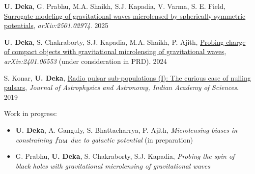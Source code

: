 \begin{itemize}[noitemsep]
{
\item\textbf{U. Deka}, G. Prabhu, M.A. Shaikh, S.J. Kapadia, V. Varma, S. E. Field, \href{https://arxiv.org/abs/2501.02974}{Surrogate modeling of gravitational waves microlensed by spherically symmetric potentials}, \textit{arXiv:2501.02974}. \hfill 2025
\item \textbf{U. Deka}, S. Chakraborty, S.J. Kapadia, M.A. Shaikh, P. Ajith, \href{https://arxiv.org/pdf/2401.06553}{Probing charge of compact objects with gravitational microlensing of gravitational waves}, \textit{arXiv:2401.06553} (under consideration in PRD). \hfill  2024
    
\item S. Konar, \textbf{U. Deka}, \href{https://www.ias.ac.in/article/fulltext/joaa/040/05/0042}{Radio pulsar sub-populations (I): The curious case of nulling pulsars}, \textit{Journal of Astrophysics and Astronomy, Indian Academy of Sciences}. \hfill 2019

\item Work in progress:
    \begin{itemize}
    \item\textbf{U. Deka}, A. Ganguly, S. Bhattacharrya, P. Ajith, \textit{Microlensing biases in constraining $f_{\rm DM}$ due to galactic potential} (in preparation)
    \item G. Prabhu, \textbf{U. Deka}, S. Chakraborty, S.J. Kapadia, \textit{Probing the spin of black holes with gravitational microlensing of gravitational waves}
    \end{itemize}
}\end{itemize}